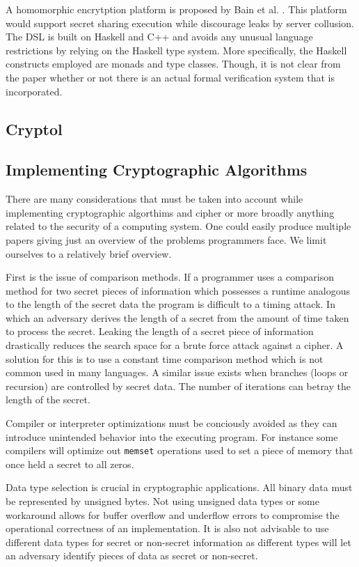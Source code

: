 A homomorphic encrytption platform is proposed by Bain et al. \cite{Bain}. This platform would support secret sharing execution while discourage leaks by server collusion. The DSL is built on Haskell and C++ and avoids any unusual language restrictions by relying on the Haskell type system. More specifically, the Haskell constructs employed are monads and type classes. Though, it is not clear from the paper whether or not there is an actual formal verification system that is incorporated.  


\subsection{Cryptol}

\subsection{Implementing Cryptographic Algorithms}
There are many considerations that must be taken into account while implementing cryptographic algorthims and cipher or more broadly anything related to the security of 
a computing system\cite{CryptoCoding}. One could easily produce multiple papers giving just an overview of the problems programmers face. We limit ourselves to a relatively brief overview.

First is the issue of comparison methods. If a programmer uses a comparison method for two secret pieces of information which possesses a runtime analogous to the length 
of the secret data the program is difficult to a timing attack. In which an adversary derives the length of a secret from the amount of time taken to process the secret. 
Leaking the length of a secret piece of information drastically reduces the search space for a brute force attack against a cipher. A solution for this is to use a 
constant time comparison method which is not common used in many languages. A similar issue exists when branches (loops or recursion) are controlled by secret data. The 
number of iterations can betray the length of the secret.

Compiler or interpreter optimizations must be conciously avoided as they can introduce unintended behavior into the executing program. For instance some compilers will 
optimize out \texttt{memset} operations used to set a piece of memory that once held a secret to all zeros.

Data type selection is crucial in cryptographic applications. All binary data must be represented by unsigned bytes. Not using unsigned data types or some workaround allows 
for buffer overflow and underflow errors to compromise the operational correctness of an implementation. It is also not advisable to use different data types for secret or 
non-secret information as different types will let an adversary identify pieces of data as secret or non-secret.

